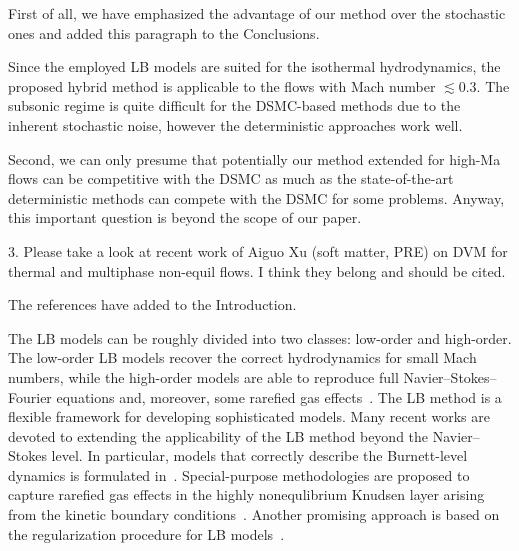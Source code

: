 \documentclass{article}
\begin{document}

First of all, we have emphasized the advantage of our method over the stochastic ones
and added this paragraph to the Conclusions.

\begin{leftbar}
    Since the employed LB models are suited for the isothermal hydrodynamics,
    the proposed hybrid method is applicable to the flows with Mach number $\lesssim0.3$.
    The subsonic regime is quite difficult for the DSMC-based methods due to the inherent stochastic noise,
    however the deterministic approaches work well.
\end{leftbar}

Second, we can only presume that potentially our method extended for high-Ma flows
can be competitive with the DSMC as much as the state-of-the-art deterministic methods
can compete with the DSMC for some problems.
Anyway, this important question is beyond the scope of our paper.

\begin{quoting}
    3. Please take a look at recent work of Aiguo Xu (soft matter, PRE) on DVM for
    thermal and multiphase non-equil flows. I think they belong and should be cited.
\end{quoting}

The references have added to the Introduction.

\begin{leftbar}
    The LB models can be roughly divided into two classes: low-order and high-order.
    The low-order LB models recover the correct hydrodynamics for small Mach numbers,
    while the high-order models are able to reproduce full Navier--Stokes--Fourier equations
    and, moreover, some rarefied gas effects~\cite{Succi2001, Shan2006}.
    The LB method is a flexible framework for developing sophisticated models.
    Many recent works are devoted to extending the applicability of the LB method beyond the Navier--Stokes level.
    In particular, models that correctly describe the Burnett-level dynamics is formulated in~\cite{Xu2018, Xu2019}.
    Special-purpose methodologies are proposed to capture rarefied gas effects in the highly nonequlibrium Knudsen layer
    arising from the kinetic boundary conditions~\cite{Feuchter2016, Ambrus2014, Ambrus2016, Ambrus2016mixed}.
    Another promising approach is based on the regularization procedure for LB models~\cite{Mont2015}.
\end{leftbar}
\end{document}
